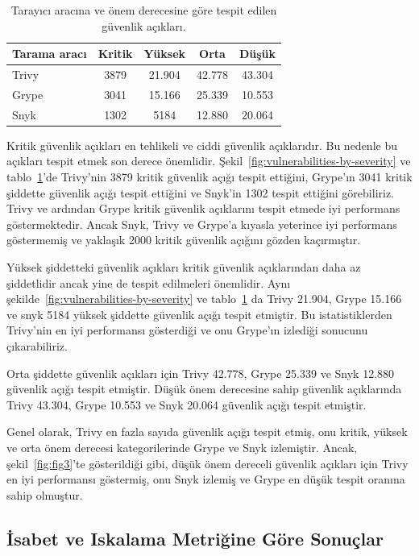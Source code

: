 \begin{table}
    \centering
    \begin{tabular}{ |l|c|c|c|c| }
        \hline
        Tarama aracı & Kritik & Yüksek & Orta & Düşük \\
        \hline
        Trivy & 3879 & 21.904 & 42.778 & 43.304 \\
        Grype & 3041 & 15.166 & 25.339 & 10.553 \\
        Snyk  & 1302 & 5184  & 12.880 & 20.064 \\
        \hline
    \end{tabular}
    \caption{Tarayıcı aracına ve önem derecesine göre tespit edilen güvenlik açıkları.}\label{tab:scanner-vuln-severity}
\end{table}

Kritik güvenlik açıkları en tehlikeli ve ciddi güvenlik açıklarıdır. Bu nedenle bu açıkları tespit etmek son derece önemlidir. Şekil~\ref{fig:vulnerabilities-by-severity} ve tablo~\ref{tab:scanner-vuln-severity}'de Trivy'nin 3879 kritik güvenlik açığı tespit ettiğini, Grype'ın 3041 kritik şiddette güvenlik açığı tespit ettiğini ve Snyk'in 1302 tespit ettiğini görebiliriz. Trivy ve ardından Grype kritik güvenlik açıklarını tespit etmede iyi performans göstermektedir. Ancak Snyk, Trivy ve Grype'a kıyasla yeterince iyi performans göstermemiş ve yaklaşık 2000 kritik güvenlik açığını gözden kaçırmıştır.

Yüksek şiddetteki güvenlik açıkları kritik güvenlik açıklarından daha az şiddetlidir ancak yine de tespit edilmeleri önemlidir. Aynı şekilde~\ref{fig:vulnerabilities-by-severity} ve tablo~\ref{tab:scanner-vuln-severity} da Trivy 21.904, Grype 15.166 ve snyk 5184 yüksek şiddette güvenlik açığı tespit etmiştir. Bu istatistiklerden Trivy'nin en iyi performansı gösterdiği ve onu Grype'ın izlediği sonucunu çıkarabiliriz.

Orta şiddette güvenlik açıkları için Trivy 42.778, Grype 25.339 ve Snyk 12.880 güvenlik açığı tespit etmiştir. Düşük önem derecesine sahip güvenlik açıklarında Trivy 43.304, Grype 10.553 ve Snyk 20.064 güvenlik açığı tespit etmiştir.

Genel olarak, Trivy en fazla sayıda güvenlik açığı tespit etmiş, onu kritik, yüksek ve orta önem derecesi kategorilerinde Grype ve Snyk izlemiştir. Ancak, şekil~\ref{fig:fig3}'te gösterildiği gibi, düşük önem dereceli güvenlik açıkları için Trivy en iyi performansı göstermiş, onu Snyk izlemiş ve Grype en düşük tespit oranına sahip olmuştur.

\subsection{İsabet ve Iskalama Metriğine Göre Sonuçlar}\label{subsec:ResultsbyHitandMissMetric}

